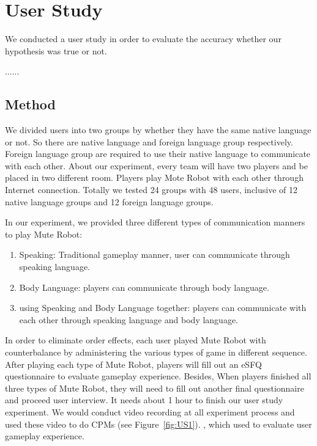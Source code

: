 

\section{User Study}

We conducted a user study in order to evaluate the accuracy whether our hypothesis was true or not.

......

\subsection{Method}

We divided users into two groups by whether they have the same native language or not. So there are native language and foreign language group respectively. Foreign language group are required to use their native language to communicate with each other. About our experiment, every team will have two players and be placed in two different room. Players play Mote Robot with each other through Internet connection. Totally we tested 24 groups with 48 users, inclusive of 12 native language groups and 12 foreign language groups.

In our experiment, we provided three different types of communication manners to play Mute Robot:
\begin{enumerate}
    \item Speaking: 
    Traditional gameplay manner, user can communicate through speaking language.
    \item Body Language: 
    players can communicate through body language.
    \item using Speaking and Body Language together: 
    players can communicate with each other through speaking language and body language.
\end{enumerate}

In order to eliminate order effects, each user played Mute Robot with counterbalance by administering the various types of game in different sequence. After playing each type of Mute Robot, players will fill out an eSFQ\cite{eSFQ} questionnaire to evaluate gameplay experience. Besides, When players finished all three types of Mute Robot, they will need to fill out another final questionnaire and proceed user interview. It needs about 1 hour to finish our user study experiment. We would conduct video recording at all experiment process and used these video to do CPMs\cite{CPMS} (see Figure~\ref{fig:US1}). , which used to evaluate user gameplay experience.

